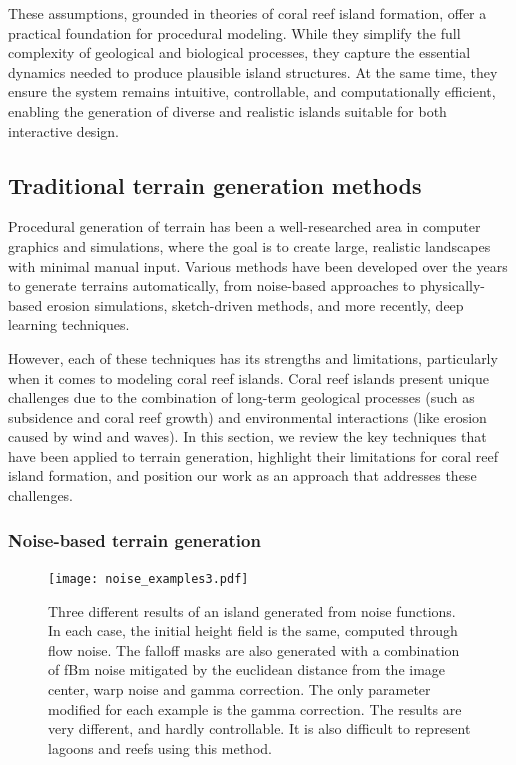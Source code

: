 These assumptions, grounded in theories of coral reef island formation, offer a practical foundation for procedural modeling. While they simplify the full complexity of geological and biological processes, they capture the essential dynamics needed to produce plausible island structures. At the same time, they ensure the system remains intuitive, controllable, and computationally efficient, enabling the generation of diverse and realistic islands suitable for both interactive design.





\subsection{Traditional terrain generation methods}
\label{sec:coral-island_sota-traditional}

Procedural generation of terrain has been a well-researched area in computer graphics and simulations, where the goal is to create large, realistic landscapes with minimal manual input. Various methods have been developed over the years to generate terrains automatically, from noise-based approaches to physically-based erosion simulations, sketch-driven methods, and more recently, deep learning techniques.

However, each of these techniques has its strengths and limitations, particularly when it comes to modeling coral reef islands. Coral reef islands present unique challenges due to the combination of long-term geological processes (such as subsidence and coral reef growth) and environmental interactions (like erosion caused by wind and waves). In this section, we review the key techniques that have been applied to terrain generation, highlight their limitations for coral reef island formation, and position our work as an approach that addresses these challenges.


\subsubsection{Noise-based terrain generation}

\begin{figure}[ht]
    \centering
    \texttt{[image: noise\_examples3.pdf]}
    \caption{Three different results of an island generated from noise functions. In each case, the initial height field is the same, computed through flow noise. The falloff masks are also generated with a combination of fBm noise mitigated by the euclidean distance from the image center, warp noise and gamma correction. The only parameter modified for each example is the gamma correction. The results are very different, and hardly controllable. It is also difficult to represent lagoons and reefs using this method.}
    \label{fig:coral-island_noise-example}
\end{figure}

